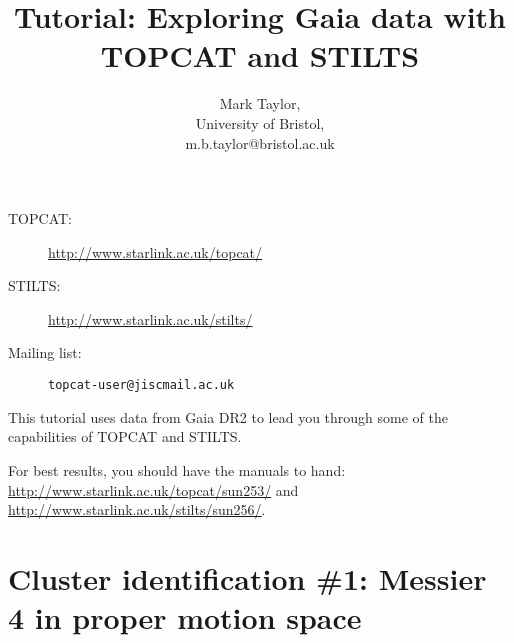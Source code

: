 \documentclass{article}
\newcommand{\turl}[1]{{\color{blue}\url{#1}}}
\begin{document}
\raggedright

\title{Tutorial: Exploring Gaia data with TOPCAT and STILTS}
\author{Mark Taylor,\\
        University of Bristol,\\
        m.b.taylor@bristol.ac.uk}
\date{\vspace*{-4ex}}  %

\maketitle

\begin{description}
  \item[TOPCAT:] \turl{http://www.starlink.ac.uk/topcat/}
  \item[STILTS:] \turl{http://www.starlink.ac.uk/stilts/}
  \item[Mailing list:] {\tt topcat-user@jiscmail.ac.uk}
\end{description}
\tableofcontents

\vspace*{2cm}
\begin{center}
  \color{grey}
  {\tt }
\end{center}

\newpage

This tutorial uses data from Gaia DR2 \cite{dr2} to lead you
through some of the capabilities of TOPCAT and STILTS.

For best results, you should have the manuals to hand:
\url{http://www.starlink.ac.uk/topcat/sun253/} and
\url{http://www.starlink.ac.uk/stilts/sun256/}.

\section{Cluster identification \#1: Messier 4 in proper motion space}
\end{document}
